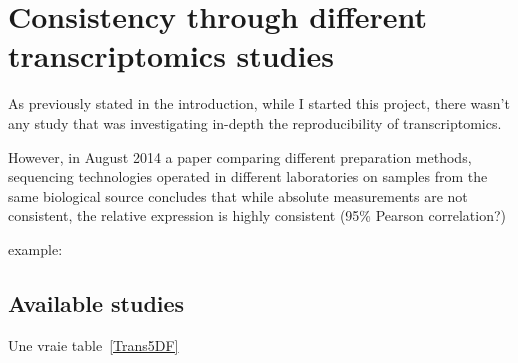 \chapter{Consistency through different transcriptomics studies}
\label{sec:Transcriptomics}

As previously stated in the introduction, while I started this project,
there wasn't any study that was investigating in-depth the reproducibility of
transcriptomics.

However, in August 2014 a paper comparing different preparation methods,
sequencing technologies operated in different laboratories
on samples from the same biological source concludes that while absolute
measurements are not consistent, the relative expression is highly consistent
(95\% Pearson correlation?)


example: \cite{schwanhausserglobal:2011}



\section{Available studies}
\label{sec:Trans_AvailableStudies}
Une vraie table~\ref{Trans5DF}

